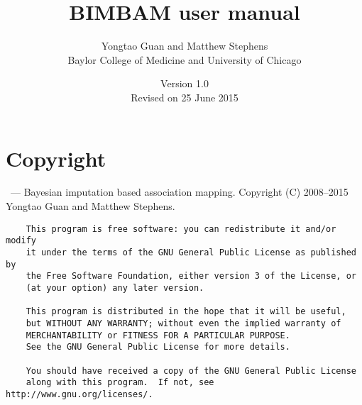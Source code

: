 \documentclass[11pt,Palatino]{article}
\title{ {BIMBAM user manual}}
\author{Yongtao Guan and Matthew Stephens\\Baylor College of Medicine and University of Chicago}
\date{Version 1.0 \\Revised on 25 June 2015} %
\def\bimbam{{\sc bimbam}~}
\begin{document}
\maketitle
\tableofcontents
\clearpage

\section{Copyright}

\indent \bimbam --- Bayesian imputation based association mapping.
    Copyright (C) 2008--2015 Yongtao Guan and Matthew Stephens.  
\begin{verbatim}
    This program is free software: you can redistribute it and/or modify
    it under the terms of the GNU General Public License as published by
    the Free Software Foundation, either version 3 of the License, or
    (at your option) any later version.

    This program is distributed in the hope that it will be useful,
    but WITHOUT ANY WARRANTY; without even the implied warranty of
    MERCHANTABILITY or FITNESS FOR A PARTICULAR PURPOSE.  
    See the GNU General Public License for more details.

    You should have received a copy of the GNU General Public License
    along with this program.  If not, see http://www.gnu.org/licenses/.
\end{verbatim}
\end{document}
